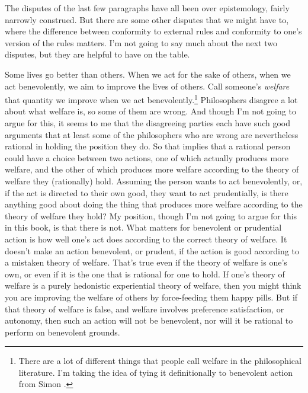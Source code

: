 The disputes of the last few paragraphs have all been over epistemology, fairly narrowly construed. But there are some other disputes that we might have to, where the difference between conformity to external rules and conformity to one's version of the rules matters. I'm not going to say much about the next two disputes, but they are helpful to have on the table.

Some lives go better than others. When we act for the sake of others, when we act benevolently, we aim to improve the lives of others. Call someone's \emph{welfare} that quantity we improve when we act benevolently.\footnote{There are a lot of different things that people call welfare in the philosophical literature. I'm taking the idea of tying it definitionally to benevolent action from Simon \citet{Keller2009}.} Philosophers disagree a lot about what welfare is, so some of them are wrong. And though I'm not going to argue for this, it seems to me that the disagreeing parties each have such good arguments that at least some of the philosophers who are wrong are nevertheless rational in holding the position they do. So that implies that a rational person could have a choice between two actions, one of which actually produces more welfare, and the other of which produces more welfare according to the theory of welfare they (rationally) hold. Assuming the person wants to act benevolently, or, if the act is directed to their own good, they want to act prudentially, is there anything good about doing the thing that produces more welfare according to the theory of welfare they hold? My position, though I'm not going to argue for this in this book, is that there is not. What matters for benevolent or prudential action is how well one's act does according to the correct theory of welfare. It doesn't make an action benevolent, or prudent, if the action is good according to a mistaken theory of welfare. That's true even if the theory of welfare is one's own, or even if it is the one that is rational for one to hold. If one's theory of welfare is a purely hedonistic experiential theory of welfare, then you might think you are improving the welfare of others by force-feeding them happy pills. But if that theory of welfare is false, and welfare involves preference satisfaction, or autonomy, then such an action will not be benevolent, nor will it be rational to perform on benevolent grounds.


